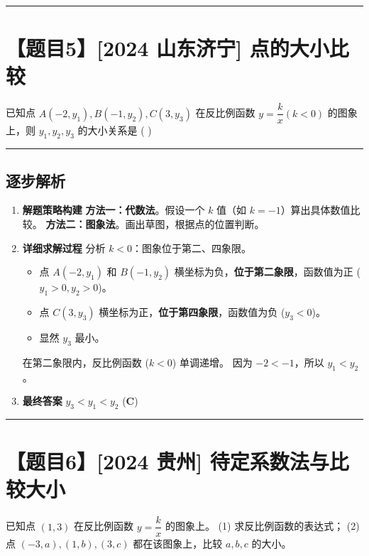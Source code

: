 \documentclass[UTF8]{ctexart}
\newenvironment{redenv}{\color{red}}{}
\newenvironment{detailedanalysis}{%
    \color{red}
    \begin{enumerate}[label=\textbf{第\arabic*步：}, leftmargin=*, align=left, itemsep=1.5ex]
}{%
    \end{enumerate}
}
\newcommand{\problemrule}{\noindent\rule{\textwidth}{1.5pt}\vspace{-0.8em}}
\newcommand{\analysisrule}{\noindent\rule{\textwidth}{0.8pt}\vspace{-0.8em}}
\begin{document}
\problemrule
\section*{【题目5】[2024 山东济宁] 点的大小比较}
已知点 $A(-2,y_1), B(-1,y_2), C(3,y_3)$ 在反比例函数 $y=\dfrac{k}{x} (k<0)$ 的图象上，则 $y_1, y_2, y_3$ 的大小关系是 ( \quad )

\begin{redenv}
\analysisrule
\subsection*{逐步解析}

\begin{detailedanalysis}
\item \textbf{解题策略构建}
\textbf{方法一：代数法}。假设一个 $k$ 值（如 $k=-1$）算出具体数值比较。
\textbf{方法二：图象法}。画出草图，根据点的位置判断。

\item \textbf{详细求解过程}
分析 $k<0$：图象位于第二、四象限。
\begin{itemize}
    \item 点 $A(-2, y_1)$ 和 $B(-1, y_2)$ 横坐标为负，\textbf{位于第二象限}，函数值为正 ($y_1>0, y_2>0$)。
    \item 点 $C(3, y_3)$ 横坐标为正，\textbf{位于第四象限}，函数值为负 ($y_3<0$)。
    \item 显然 $y_3$ 最小。
\end{itemize}
在第二象限内，反比例函数 ($k<0$) 单调递增。
因为 $-2 < -1$，所以 $y_1 < y_2$。

\item \textbf{最终答案}
$y_3 < y_1 < y_2$ (\textbf{C})
\end{detailedanalysis}
\end{redenv}

\problemrule
\section*{【题目6】[2024 贵州] 待定系数法与比较大小}
已知点 $(1,3)$ 在反比例函数 $y=\dfrac{k}{x}$ 的图象上。
(1) 求反比例函数的表达式；
(2) 点 $(-3, a), (1, b), (3, c)$ 都在该图象上，比较 $a, b, c$ 的大小。
\end{document}
